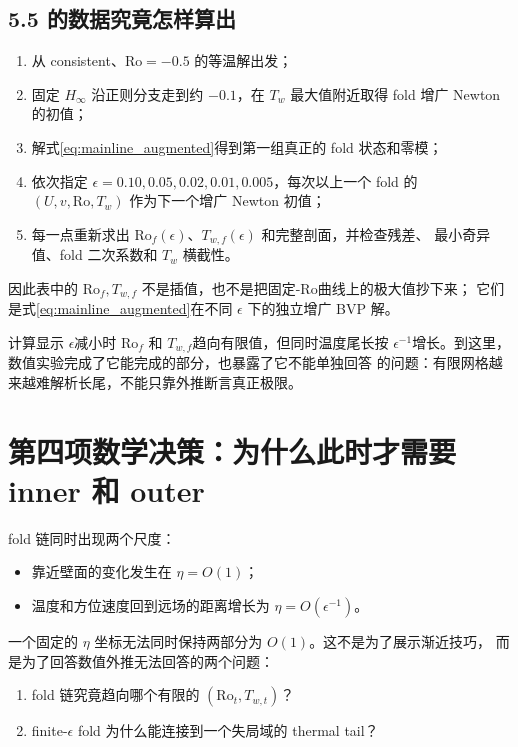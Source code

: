 \documentclass[UTF8,zihao=-4,openany]{ctexbook}
\newcommand{\eps}{\epsilon}
\newcommand{\Ro}{\mathrm{Ro}}
\begin{document}
\subsection*{5.5 的数据究竟怎样算出}

\begin{enumerate}
  \item 从 consistent、$\Ro=-0.5$ 的等温解出发；
  \item 固定 $H_\infty$ 沿正则分支走到约 $-0.1$，在 $T_w$ 最大值附近取得 fold
  增广 Newton 的初值；
  \item 解式\eqref{eq:mainline_augmented}得到第一组真正的 fold 状态和零模；
  \item 依次指定 $\eps=0.10,0.05,0.02,0.01,0.005$，每次以上一个 fold 的
  $(U,v,\Ro,T_w)$ 作为下一个增广 Newton 初值；
  \item 每一点重新求出 $\Ro_f(\eps)$、$T_{w,f}(\eps)$ 和完整剖面，并检查残差、
  最小奇异值、fold 二次系数和 $T_w$ 横截性。
\end{enumerate}
因此表中的 $\Ro_f,T_{w,f}$ 不是插值，也不是把固定-$\Ro$曲线上的极大值抄下来；
它们是式\eqref{eq:mainline_augmented}在不同 $\eps$ 下的独立增广 BVP 解。

计算显示 $\eps$减小时 $\Ro_f$ 和 $T_{w,f}$趋向有限值，但同时温度尾长按
$\eps^{-1}$增长。到这里，数值实验完成了它能完成的部分，也暴露了它不能单独回答
的问题：有限网格越来越难解析长尾，不能只靠外推断言真正极限。

\section{第四项数学决策：为什么此时才需要 inner 和 outer}

fold 链同时出现两个尺度：
\begin{itemize}
  \item 靠近壁面的变化发生在 $\eta=O(1)$；
  \item 温度和方位速度回到远场的距离增长为 $\eta=O(\eps^{-1})$。
\end{itemize}
一个固定的 $\eta$ 坐标无法同时保持两部分为 $O(1)$。这不是为了展示渐近技巧，
而是为了回答数值外推无法回答的两个问题：
\begin{enumerate}
  \item fold 链究竟趋向哪个有限的 $(\Ro_t,T_{w,t})$？
  \item finite-$\eps$ fold 为什么能连接到一个失局域的 thermal tail？
\end{enumerate}
\end{document}
